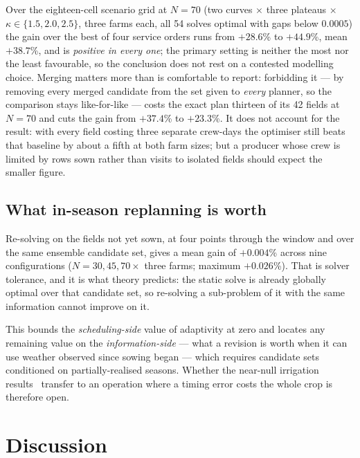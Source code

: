 \documentclass[10pt,twocolumn]{article}
\begin{document}
Over the eighteen-cell scenario grid at $N = 70$ (two curves $\times$ three
plateaus $\times$ $\kappa \in \{1.5, 2.0, 2.5\}$, three farms each, all 54
solves optimal with gaps below $0.0005$) the gain over the best of four
service orders runs from $+28.6$\% to $+44.9$\%, mean $+38.7$\%, and is
\emph{positive in every one}; the primary setting is neither the most nor
the least favourable, so the conclusion does not rest on a contested
modelling choice. Merging matters more than is
comfortable to report: forbidding it --- by removing every merged candidate
from the set given to \emph{every} planner, so the comparison stays
like-for-like --- costs the exact plan thirteen of its 42 fields at $N = 70$
and cuts the gain from $+37.4$\% to $+23.3$\%. It does not account for the
result: with every field costing three separate crew-days the
optimiser still beats that baseline by about a fifth at both farm sizes; but
a producer whose crew is limited by rows sown rather than visits to isolated
fields should expect the smaller figure.

\subsection{What in-season replanning is worth}
\label{sec:replan}

Re-solving on the fields not yet sown, at four points through the window and
over the same ensemble candidate set, gives a mean gain of $+0.004$\% across
nine configurations ($N = 30, 45, 70 \times$ three farms; maximum
$+0.026$\%). That is solver tolerance, and it is what theory predicts: the
static solve is already globally optimal over that candidate set, so
re-solving a sub-problem of it with the same information cannot improve on
it.

This bounds the \emph{scheduling-side} value of adaptivity at zero and
locates any remaining value on the \emph{information-side} --- what a
revision is worth when it can use weather observed since sowing began ---
which requires candidate sets conditioned on partially-realised seasons.
Whether the near-null irrigation
results~\cite{kelly2023,becker2026} transfer to an operation where a timing
error costs the whole crop is therefore open.

\section{Discussion}
\label{sec:limits}
\label{sec:iot}
\end{document}
